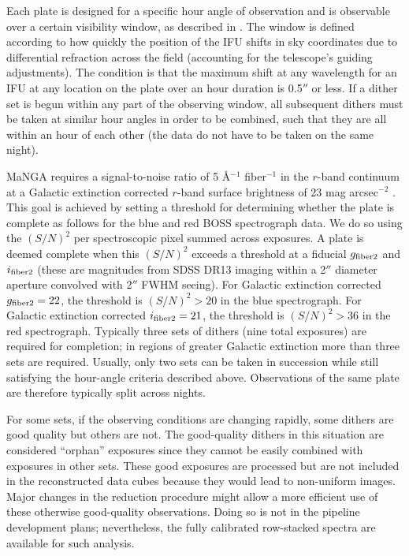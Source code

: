 Each plate is designed for a specific hour angle of observation and is
observable over a certain visibility window, as described in
\citet{law15a}. The window is defined according to how quickly the
position of the IFU shifts in sky coordinates due to differential
refraction across the field (accounting for the telescope's guiding
adjustments). The condition is that the maximum shift at any
wavelength for an IFU at any location on the plate over an hour
duration is 0.5$''$ or less.  If a dither set is begun within any part
of the observing window, all subsequent dithers must be taken at
similar hour angles in order to be combined, such that they are all
within an hour of each other (the data do not have to be taken on the
same night).

MaNGA requires a signal-to-noise ratio of 5 \AA$^{-1}$ fiber$^{-1}$ in
the $r$-band continuum at a Galactic extinction corrected $r$-band
surface brightness of 23 mag arcsec$^{-2}$ \citep[AB
  magnitude;][]{oke83a}. This goal is achieved by setting a threshold
for determining whether the plate is complete as follows for the blue
and red BOSS spectrograph data. We do so using the $(S/N)^2$ per
spectroscopic pixel summed across exposures. A plate is deemed
complete when this $(S/N)^2$ exceeds a threshold at a fiducial $g_{\rm
  fiber2}$ and $i_{\rm fiber2}$ (these are magnitudes from SDSS DR13
imaging \citep{ahn12a} within a 2$''$ diameter aperture convolved with
2$''$ FWHM seeing).  For Galactic extinction corrected $g_{\rm
  fiber2}=22$, the threshold is $(S/N)^2>20$ in the blue spectrograph.
For Galactic extinction corrected $i_{\rm fiber2}=21$, the threshold
is $(S/N)^2>36$ in the red spectrograph.  Typically three sets of
dithers (nine total exposures) are required for completion; in regions
of greater Galactic extinction more than three sets are required.
Usually, only two sets can be taken in succession while still
satisfying the hour-angle criteria described above. Observations of
the same plate are therefore typically split across nights.

For some sets, if the observing conditions are changing rapidly, some
dithers are good quality but others are not. The good-quality dithers
in this situation are considered ``orphan'' exposures since they
cannot be easily combined with exposures in other sets. These good
exposures are processed but are not included in the reconstructed data
cubes because they would lead to non-uniform images. Major changes in
the reduction procedure might allow a more efficient use of these
otherwise good-quality observations. Doing so is not in the pipeline
development plans; nevertheless, the fully calibrated row-stacked
spectra are available for such analysis.

